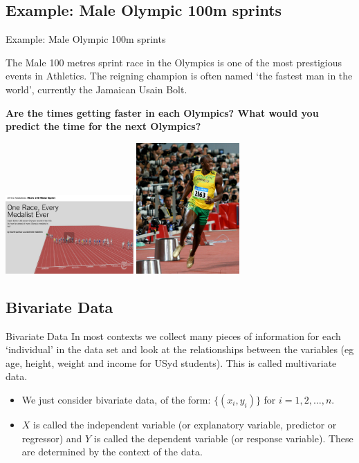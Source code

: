 \documentclass[t,xcolor=pdftex,dvipsnames,table]{beamer}\usepackage[]{graphicx}\usepackage[]{color}
\begin{document}
\subsection[]{Example: Male Olympic 100m sprints}
\begin{frame}[fragile]{Example: Male Olympic 100m sprints}

The Male 100 metres sprint race in the Olympics is one of the most prestigious events in Athletics. The reigning champion is often named `the fastest man in the world', currently the Jamaican Usain Bolt. 

\vspace{.5cm}
{\bf Are the times getting faster in each Olympics? What would you predict the time for the next Olympics?}

\includegraphics[height=3cm]{../images/Olympics100m.jpg}
\includegraphics[height=5cm]{../images/UsainBolt.jpg}

\href{http://www.nytimes.com/interactive/2012/08/05/sports/olympics/the-100-meter-dash-one-race-every-medalist-ever.html}{}
\end{frame}

\subsection[]{Bivariate Data}
\begin{frame}[fragile]{Bivariate Data}
In most contexts we collect many pieces of information for each ‘individual’ in the data set and look at the relationships between the variables (eg age, height, weight and income for USyd students).  This is called multivariate data.

\begin{itemize}
\item
We just consider bivariate data, of the form: $\{ (x_i,y_i) \}$ for  $i=1,2, \ldots, n$.

\item
$X$ is called the independent variable (or explanatory variable, predictor or regressor) and $Y$ is called the dependent variable (or response variable). These are determined by the context of the data.
\end{itemize}
\end{frame}
\end{document}
